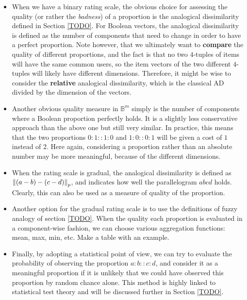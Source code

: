 \begin{itemize}
  \item When we have a binary rating scale, the obvious choice for assessing
    the quality (or rather the \textit{badness}) of a proportion is the
    analogical dissimilarity defined in Section \ref{TODO}. For Boolean
    vectors, the analogical dissimilarity is defined as the number of
    components that need to change in order to have a perfect proportion. Note
    however, that we ultimately want to \textbf{compare} the quality of
    different proportions, and the fact is that no two $4$-tuples of items will
    have the same common users, so the item vectors of the two different
    $4$-tuples will likely have different dimensions. Therefore, it might be
    wise to consider the \textbf{relative} analogical dissimilarity, which is
    the classical AD divided by the dimension of the vectors.
  \item Another obvious quality measure in $\mathbb{B}^m$ simply is the number
    of components where a Boolean proportion perfectly holds. It is a slightly
    less conservative approach than the above one but still very similar. In
    practice, this means that the two proportions $0:1::1:0$ and $1:0::0:1$
    will be given a cost of $1$ instead of $2$. Here again, considering a
    proportion rather than an absolute number may be more meaningful, because
    of the different dimensions.
  \item When the rating scale is gradual, the analogical dissimilarity is
    defined as $\norm{p}{(a - b) - (c - d)}$, and indicates how well the
    parallelogram $abcd$ holds. Clearly, this can also be used as a measure of
    quality of the proportion.
  \item Another option for the gradual rating scale is to use the definitions
    of fuzzy analogy of section \ref{TODO}. When the quality
    each proportion is evaluated in a component-wise fashion, we can choose
    various aggregation functions: mean, max, min, etc. Make a table with an
    example.
  \item Finally, by adopting a statistical point of view, we can try to
    evaluate the probability of observing the proportion $a:b::c:d$, and
    consider it as a meaningful proportion if it is unlikely that we could have
    observed this proportion by random chance alone. This method is highly
    linked to statistical test theory and will be discussed further in Section
    \ref{TODO}.
\end{itemize}

